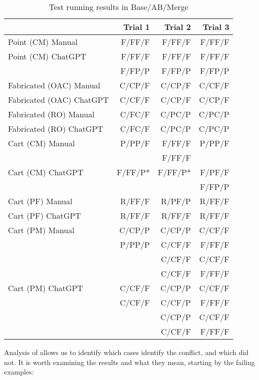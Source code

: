 \begin{table}[t]
    \centering
    \begin{tabular}{@{\extracolsep{\fill}} lrrr} \toprule
                             & Trial 1 & Trial 2 & Trial 3 \\
    \midrule
    Point (CM) Manual        & F/FF/F & F/FF/F & F/FF/F \\
    Point (CM) ChatGPT       & F/FF/F & F/FF/F & F/FF/F \\
                             & F/FP/P & F/FP/P & F/FP/P \\
    Fabricated (OAC) Manual  & C/CP/F & C/CP/F & C/CF/F \\
    Fabricated (OAC) ChatGPT & C/CF/F & C/CP/F & C/CP/F \\
    Fabricated (RO) Manual   & C/FC/F & C/PC/P & C/PC/P \\
    Fabricated (RO) ChatGPT  & C/FC/F & C/PC/P & C/PC/P \\
    Cart (CM) Manual         & P/PP/F & F/FF/F & P/PP/F \\
                             &  & F/FF/F &  \\
    Cart (CM) ChatGPT        & F/FF/P* & F/FF/P* & F/PF/F \\
                             &  &  & F/FP/P \\
    Cart (PF) Manual         & R/FF/F & R/PF/P & R/FF/F \\
    Cart (PF) ChatGPT        & R/FF/F & R/FF/F & R/FF/F \\
    Cart (PM) Manual         & C/CP/P & C/CP/P & C/CF/F \\
                             & P/PP/P & C/CF/F & F/FF/F \\
                             &  & C/CF/F & C/CF/F \\
                             &  & C/CF/F & F/FF/F \\
    Cart (PM) ChatGPT        & C/CF/F & C/CP/P & C/CF/F \\
                             & C/CF/F & C/CF/P & F/FF/F \\
                             &  & C/CP/P & C/CF/F \\
                             &  & C/CF/F & F/FF/F \\
    \midrule
    \end{tabular}
    \caption{Test running results in Base/AB/Merge \label{tab:results:rq2tests}}
\end{table}

Analysis of  allows us to identify which cases identify the conflict, and which did not.
It is worth examining the results and what they mean, starting by the failing examples:

